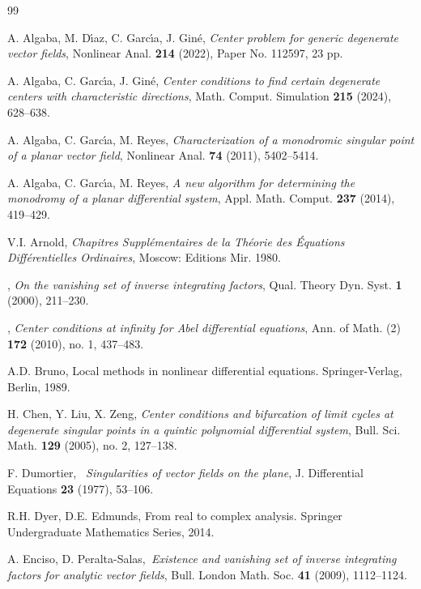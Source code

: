 \documentclass[12pt]{amsart}
\begin{document}
\begin{thebibliography}{99}

 {\sc A. Algaba, M. D\' \i az, C. Garc\' \i a, J. Gin\'e}, {\it Center problem for generic degenerate vector fields}, Nonlinear Anal. {\bf 214} (2022), Paper No. 112597, 23 pp.

 {\sc A. Algaba,  C. Garc\' \i a, J. Gin\'e}, {\it  Center conditions to find certain degenerate centers with characteristic directions}, Math. Comput. Simulation {\bf 215} (2024), 628--638.

 {\sc A. Algaba, C. Garc\' \i a, M. Reyes}, {\it Characterization of a monodromic singular point of a planar vector field}, Nonlinear Anal. {\bf 74} (2011), 5402--5414.

 {\sc A. Algaba, C. Garc\' \i a, M. Reyes}, {\it A new algorithm for determining the monodromy of a planar differential system}, Appl. Math. Comput. {\bf 237} (2014), 419--429.

 {\sc V.I. Arnold}, {\it Chapitres Suppl\'ementaires de la Th\'eorie des \'Equations Diff\'erentielles Ordinaires}, Moscow: Editions Mir. 1980.

 , {\it On the vanishing set of inverse integrating factors}, Qual. Theory Dyn. Syst. {\bf 1} (2000), 211--230.

, {\it Center conditions at infinity for Abel differential equations},  Ann. of Math. (2) {\bf 172} (2010), no. 1, 437--483.

 {\sc A.D. Bruno}, Local methods in nonlinear differential equations. Springer-Verlag, Berlin, 1989.

 {\sc H. Chen, Y. Liu, X. Zeng}, { \it Center conditions and bifurcation of limit cycles at degenerate singular points in a quintic polynomial differential system}, Bull. Sci. Math. {\bf 129} (2005), no. 2, 127--138.

 {\sc F. Dumortier,} {\it \ Singularities of vector fields on the plane}, J. Differential Equations
    {\bf 23} (1977), 53--106.

 {\sc R.H. Dyer, D.E. Edmunds}, From real to complex analysis. Springer Undergraduate Mathematics Series, 2014.

 {\sc A. Enciso, D. Peralta-Salas},{\it \ Existence and vanishing set of inverse integrating factors for analytic vector fields}, Bull. London Math. Soc. {\bf 41} (2009), 1112--1124.


\end{thebibliography}
\end{document}
